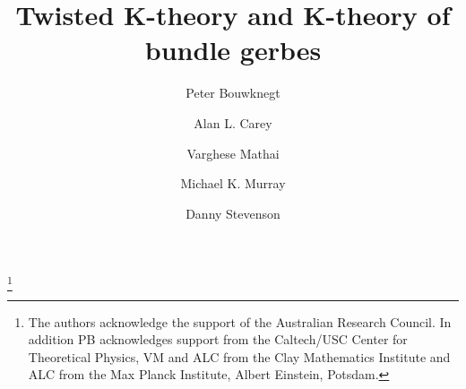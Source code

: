\documentclass[a4paper,reqno]{amsart}
\theoremstyle{plain}
\theoremstyle{definition}
\theoremstyle{remark}
\numberwithin{equation}{section}
\numberwithin{figure}{section}
\providecommand{\<}{\langle}
\renewcommand{\>}{\rangle}
\begin{document}
\title[Twisted K-theory and K-theory of bundle gerbes]{Twisted K-theory
and K-theory of bundle gerbes}



\author[P. Bouwknegt]{Peter Bouwknegt}
\address[Peter Bouwknegt]
{Department of Physics and Mathematical Physics
and Department of Pure Mathematics\\
University of Adelaide\\
Adelaide, SA 5005 \\
Australia}

\author[A.L. Carey]{Alan L. Carey}
\address[Alan L. Carey]
{Department of Pure Mathematics\\
University of Adelaide\\
Adelaide, SA 5005 \\
Australia}


\author[V. Mathai]{Varghese Mathai}
\address[Varghese Mathai]
{Department of Mathematics\\
MIT \\
Cambridge, MA 02139 \\
USA and Department of Pure Mathematics\\
University of Adelaide\\
Adelaide, SA 5005 \\
Australia}


\author[M.K. Murray]{Michael K. Murray}
\address[Michael K. Murray]
{Department of Pure Mathematics\\
University of Adelaide\\
Adelaide, SA 5005 \\
Australia}

\author[D. Stevenson]{Danny Stevenson}
\address[Danny Stevenson]
{Department of Pure Mathematics\\
University of Adelaide\\
Adelaide, SA 5005 \\
Australia}


\thanks{The authors acknowledge the support of the Australian
Research Council.  In addition PB acknowledges support from the
Caltech/USC Center for Theoretical Physics, VM and ALC from the
Clay Mathematics Institute and ALC from the Max Planck Institute,
Albert Einstein, Potsdam.}

\end{document}
